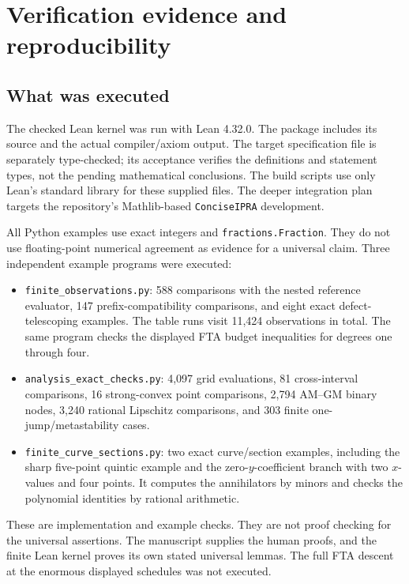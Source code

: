 \section{Verification evidence and reproducibility}
\label{sec:verification}

\subsection{What was executed}

The checked Lean kernel was run with Lean 4.32.0. The package includes
its source and the actual compiler/axiom output. The target specification
file is separately type-checked; its acceptance verifies the definitions
and statement types, not the pending mathematical conclusions.
The build scripts use only Lean's standard library for these supplied
files. The deeper integration plan targets the repository's Mathlib-based
\texttt{ConciseIPRA} development.

All Python examples use exact integers and \texttt{fractions.Fraction}.
They do not use floating-point numerical agreement as evidence for a
universal claim. Three independent example programs were executed:
\begin{itemize}
\item \texttt{finite\_observations.py}: 588 comparisons with the nested
      reference evaluator, 147 prefix-compatibility comparisons, and
      eight exact defect-telescoping examples. The table runs visit
      11,424 observations in total. The same program checks the displayed
      FTA budget inequalities for degrees one through four.
\item \texttt{analysis\_exact\_checks.py}: 4,097 grid evaluations,
      81 cross-interval comparisons, 16 strong-convex point comparisons,
      2,794 AM--GM binary nodes, 3,240 rational Lipschitz comparisons,
      and 303 finite one-jump/metastability cases.
\item \texttt{finite\_curve\_sections.py}: two exact curve/section examples,
      including the sharp five-point quintic example and the
      zero-$y$-coefficient branch with two $x$-values and four points.
      It computes the annihilators by minors and checks the polynomial
      identities by rational arithmetic.
\end{itemize}

These are implementation and example checks. They are not proof checking
for the universal \iPRA{} assertions. The manuscript supplies the human
proofs, and the finite Lean kernel proves its own stated universal lemmas.
The full FTA descent at the enormous displayed schedules was not executed.

